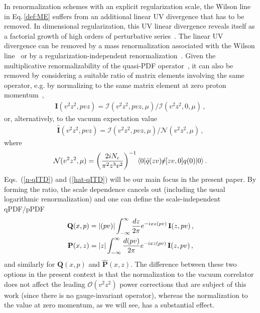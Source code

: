In renormalization schemes with an explicit regularization scale, the Wilson line in Eq.\,\eqref{def:ME} suffers 
from an additional linear UV divergence that has to be removed. In dimensional regularization, this UV linear divergence reveals itself as a factorial growth of high orders of perturbative series~\cite{Beneke:1994sw}. The linear UV divergence can be removed by a mass renormalization associated with the Wilson line~\cite{Dotsenko:1979wb,Craigie:1980qs,Dorn:1986dt} or by a regularization-independent renormalization~\cite{Martinelli:1995vj,Stewart:2017tvs,Chen:2017mzz}. Given the multiplicative renormalizability of the quasi-PDF operator~\cite{Ji:2017oey,Ishikawa:2017faj,Green:2017xeu}, it can also be removed by considering a suitable ratio of matrix elements involving the same operator, e.g. by normalizing to the same matrix element at zero proton momentum~\cite{Orginos:2017kos}, 
\begin{align}
\label{n-qITD}
     \mathbf{I}(v^2z^2, pvz) =  \mathcal{I}(v^2z^2, pvz, \mu) / \mathcal{I}(v^2z^2, 0, \mu)\,, 
\end{align}
or, alternatively, to the vacuum expectation value
\begin{align}
\label{hat-qITD}
     \widehat{\mathbf{I}}(v^2z^2, pvz) =  \mathcal{I}(v^2z^2, pvz, \mu) / \mathcal{N}(v^2z^2,\mu)\,, 
\end{align}
where
\begin{align}
  \mathcal{N}(v^2z^2,\mu) =  \left(\frac{2 i N_c}{\pi^2 z^3 v^2}\right)^{-1} \langle 0| \bar q(zv) \slashed{v} [zv,0] q(0) |0\rangle\,.
\end{align}
Eqs.~(\ref{n-qITD}) and (\ref{hat-qITD}) will be our main focus in the present paper. By forming the ratio, the scale dependence cancels out (including the usual logarithmic renormalization) and one can define the scale-independent qPDF/pPDF
\begin{align}
\mathbf{Q}(x,p) &= |(pv)| \int_{-\infty}^\infty \frac{d z }{2\pi} e^{-ix z (pv)} \, \mathbf{I}(z, pv)\,,
\notag\\
\mathbf{P}(x,z) &= |z| \int_{-\infty}^\infty \frac{d (pv)}{2\pi} e^{-ix z (pv) } \,  \mathbf{I}(z,pv)\,,     
\end{align} 
and similarly for $\widehat{\mathbf{Q}}(x,p)$ and $\widehat{\mathbf{P}}(x,z)$.
The difference between these two options in the present context is that the normalization to the vacuum correlator 
does not affect the leading $\mathcal{O}(v^2z^2)$ power corrections that are subject of this work (since there is no gauge-invariant operator),
whereas the normalization to the value at zero momentum, as we will see, has a substantial effect. 

